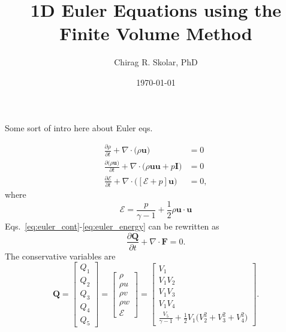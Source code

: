 \documentclass{report}
\title{1D Euler Equations using the Finite Volume Method}
\author{Chirag R. Skolar, PhD}
\date{\today}
\begin{document}
\maketitle
	
Some sort of intro here about Euler eqs.   
	
\begin{align}
	\frac{\partial \rho}{\partial t} + \nabla \cdot \big(\rho \mathbf{u} \big) &= 0  \label{eq:euler_cont} \\
	\frac{\partial \big( \rho \mathbf{u} \big) }{\partial t} + \nabla \cdot \big( \rho \mathbf{u} \mathbf{u} + p \mathbf{I} \big) &= 0  \label{eq:euler_mtm}  \\
	\frac{ \partial \mathcal{E}}{\partial t} + \nabla \cdot \big( [ \mathcal{E} + p] \mathbf{u} \big) &= 0 \label{eq:euler_energy} ,
\end{align}
where
\begin{equation}
	\mathcal{E} = \frac{p}{\gamma-1} + \frac{1}{2} \rho \mathbf{u} \cdot \mathbf{u}
\end{equation}
Eqs.~\ref{eq:euler_cont}-\ref{eq:euler_energy} can be rewritten as
\begin{equation}
	\frac{\partial \mathbf{Q}}{\partial t} + \nabla \cdot \mathbf{F} = 0 .\label{eq:hyperbolic} 
\end{equation}
The conservative variables are
\begin{equation}
	\mathbf{Q} = 
	\begin{bmatrix}
		Q_1 \\ Q_2 \\ Q_3 \\ Q_4 \\ Q_5
	\end{bmatrix} = 
	\begin{bmatrix}
		\rho \\
		\rho u \\
		\rho v \\
		\rho w \\
		\mathcal{E} 
	\end{bmatrix} = 
	\begin{bmatrix}
		V_1 \\
		V_1 V_2 \\
		V_1 V_3 \\
		V_1 V_4 \\
		\frac{V_5}{\gamma-1} + \frac{1}{2} V_1 \big( V_2^2 + V_3^2 + V_4^2 \big)
	\end{bmatrix}. \label{eq:cons_var}
\end{equation}
\end{document}
